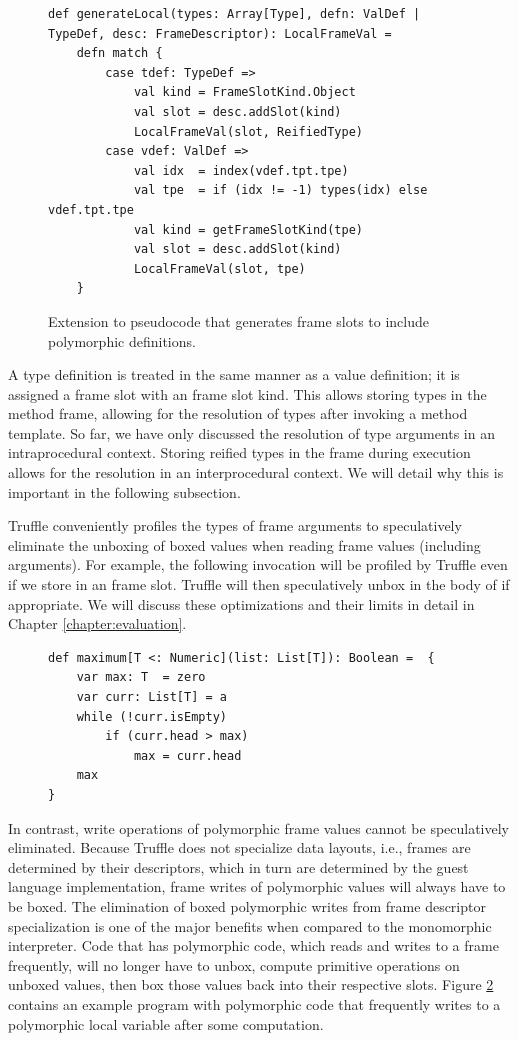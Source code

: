 \begin{figure}[!htb]
\begin{verbatim}
def generateLocal(types: Array[Type], defn: ValDef | TypeDef, desc: FrameDescriptor): LocalFrameVal = 
	defn match {
		case tdef: TypeDef => 
			val kind = FrameSlotKind.Object
			val slot = desc.addSlot(kind)
			LocalFrameVal(slot, ReifiedType)
		case vdef: ValDef => 
			val idx  = index(vdef.tpt.tpe)
			val tpe  = if (idx != -1) types(idx) else vdef.tpt.tpe
			val kind = getFrameSlotKind(tpe)
			val slot = desc.addSlot(kind)
			LocalFrameVal(slot, tpe)
	}
\end{verbatim}
\caption{Extension to pseudocode that generates frame slots to include polymorphic definitions.}
\label{impl:gen-poly-locals}
\end{figure}

A type definition is treated in the same manner as a value definition; it is assigned a frame slot with an  frame slot kind.
This allows storing types in the method frame, allowing for the resolution of types after invoking a method template.
So far, we have only discussed the resolution of type arguments in an intraprocedural context.
Storing reified types in the frame during execution allows for the resolution in an interprocedural context.
We will detail why this is important in the following subsection.

Truffle conveniently profiles the types of frame arguments to speculatively eliminate the unboxing of boxed values when reading frame values (including arguments). 
For example, the following invocation  will be profiled by Truffle even if we store  in an  frame slot.
Truffle will then speculatively unbox  in the body of  if appropriate.
We will discuss these optimizations and their limits in detail in Chapter \ref{chapter:evaluation}.

\begin{figure}[!htb]
\begin{verbatim}
def maximum[T <: Numeric](list: List[T]): Boolean =  {
	var max: T  = zero
	var curr: List[T] = a
	while (!curr.isEmpty) 
		if (curr.head > max)
			max = curr.head 
	max
}
\end{verbatim}
\caption{}
\label{impl:list-max}
\end{figure}

In contrast, write operations of polymorphic frame values cannot be speculatively eliminated. 
Because Truffle does not specialize data layouts, i.e., frames are determined by their descriptors, which in turn are determined by the guest language implementation, frame writes of polymorphic values will always have to be boxed.
The elimination of boxed polymorphic writes from frame descriptor specialization is one of the major benefits when compared to the monomorphic interpreter.
Code that has polymorphic code, which reads and writes to a frame frequently, will no longer have to unbox, compute primitive operations on unboxed values, then box those values back into their respective slots.
Figure \ref{impl:list-max} contains an example program with polymorphic code that frequently writes to a polymorphic local variable after some computation.

